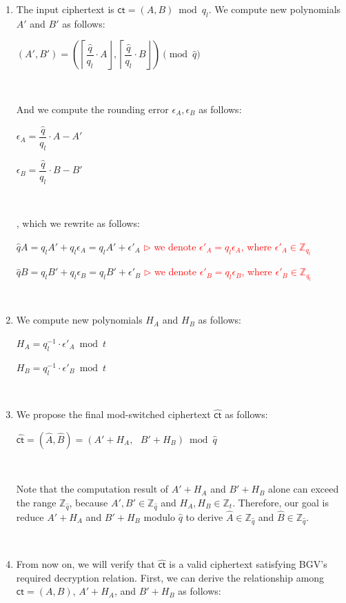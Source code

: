\begin{enumerate}


\item The input ciphertext is $\textsf{ct} = (A, B) \bmod q_l$. We compute new polynomials $A'$ and $B'$ as follows:

$(A', B') = \left(\left\lceil\dfrac{\hat{q}}{q_l}\cdot A\right\rfloor, \left\lceil\dfrac{\hat{q}}{q_l}\cdot B\right\rfloor\right) \pmod{\hat{q}}$

$ $

And we compute the rounding error $\epsilon_A, \epsilon_B$ as follows: 

$\epsilon_A = \dfrac{\hat{q}}{q_l}\cdot A - A'$

$\epsilon_B = \dfrac{\hat{q}}{q_l}\cdot B - B'$


$ $

, which we rewrite as follows:

$\hat{q} A = q_{l} A' + q_{l}\epsilon_A = q_{l} A' + \epsilon'_A$ \textcolor{red}{ $\rhd$ we denote $\epsilon'_A = q_{l}\epsilon_A$, where $\epsilon'_A \in \mathbb{Z}_{q_l}$}

$\hat{q} B = q_{l} B' + q_{l}\epsilon_B = q_{l} B' + \epsilon'_B$ \textcolor{red}{ $\rhd$ we denote $\epsilon'_B = q_{l}\epsilon_B$, where $\epsilon'_B \in \mathbb{Z}_{q_l}$}

$ $

\item We compute new polynomials $H_A$ and $H_B$ as follows:

$H_A = q_l^{-1}\cdot\epsilon'_A \bmod t$

$H_B = q_l^{-1}\cdot\epsilon'_B \bmod t$

$ $

\item We propose the final mod-switched ciphertext $\hat{\textsf{ct}}$ as follows:

$\hat{\textsf{ct}} = (\hat{A}, \hat{B}) = (A' + H_A, \text{ } B' + H_B) \bmod \hat{q}$

$ $

Note that the computation result of $A' + H_A$ and $B' + H_B$ alone can exceed the range $\mathbb{Z}_{\hat{q}}$, because $A', B' \in \mathbb{Z}_{\hat{q}}$ and $H_A, H_B \in \mathbb{Z}_t$. Therefore, our goal is reduce $A' + H_A$ and $B' + H_B$ modulo $\hat{q}$  to derive $\hat{A} \in \mathbb{Z}_{\hat{q}}$ and $\hat{B} \in \mathbb{Z}_{\hat{q}}$. 

$ $

\item From now on, we will verify that $\hat{\textsf{ct}}$ is a valid ciphertext satisfying BGV's required decryption relation. First, we can derive the relationship among $\textsf{ct} = (A, B)$, $A' + H_A$, and $B' + H_B$ as follows:


\end{enumerate}
